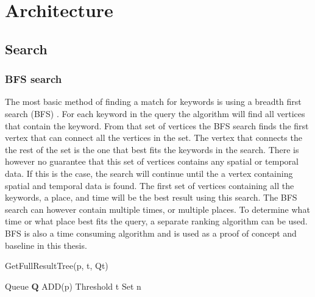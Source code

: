 \chapter{Architecture}
\label{cha:architecture}

\section{Search}
\subsection{BFS search}
The most basic method of finding a match for keywords is using a breadth first search (BFS) \cite{blinks}. For each keyword in the query the algorithm will find all vertices that contain the keyword. From that set of vertices the BFS search finds the first vertex that can connect all the vertices in the set. The vertex that connects the the rest of the set is the one that best fits the keywords in the search. There is however no guarantee that this set of vertices contains any spatial or temporal data. If this is the case, the search will continue until the a vertex containing spatial and temporal data is found. The first set of vertices containing all the keywords, a place, and time will be the best result using this search. The BFS search can however contain multiple times, or multiple places. To determine what time or what place best fits the query, a separate ranking algorithm can be used. BFS is also a time consuming algorithm and is used as a proof of concept and baseline in this thesis.

\begin{algorithm}[H]
    \caption{GetFullResultTree(p, t, Qt)}
    \SetAlgoLined
    Queue $\mathbf{Q}$ ADD(p)\; Threshold t\; Set n \;
\end{algorithm}


